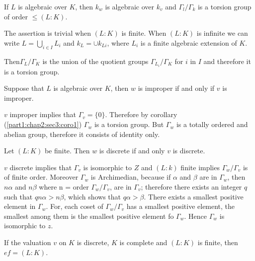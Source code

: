 \begin{corollary}\label{part1:chap2:sec3:coro1}%
  If $L$ is algebraic over $K$, then $k_w$ is algebraic over $k_v$ and
  $\Gamma_l / \Gamma _k$ is a torsion group of order $\leq (L:  K)$. 
\end{corollary}

The assertion is trivial when $(L:  K)$ is finite. When $(L:  K)$ is
infinite we can write $L = \bigcup\limits_{i \in I}L_i$ and $k_L = \cup
k_{Li}$, where $L_i$ is a finite algebraic extension of $K$. 

Then\pageoriginale $\Gamma_L / \Gamma_K$ is the union of the quotient groups
$\Gamma_{L_i} / \Gamma_K$ for $i$ in $I$ and therefore it is a torsion
group. 

\begin{corollary}\label{part1:chap2:sec3:coro2}%
  Suppose that $L$ is algebraic over $K$, then $w$ is improper if and
  only if $v$ is improper. 
\end{corollary}

$v$ improper implies that $\Gamma _v = \{0\}$. Therefore by
corollary (\ref{part1:chap2:sec3:coro1}) $\Gamma_w$ is a torsion group. But $\Gamma_w$ is a
totally ordered and abelian group, therefore it consists of identity
only. 

\begin{corollary}\label{part1:chap2:sec3:coro3}%
  Let $(L:  K)$ be finite. Then $w$ is discrete if and only $v$ is discrete.
\end{corollary}

$v$ discrete implies that $\Gamma_v$ is isomorphic to $Z$ and $(L: 
k)$ finite implies $\Gamma_w/\Gamma_v$ is of finite order. Moreover
$\Gamma_w$ is Archimedian, because if $\alpha$ and $\beta$ are in
$\Gamma_w$, then $n \alpha$ and $n \beta$ where n = order $\Gamma_w /
\Gamma _v$, are in $\Gamma_v$; therefore there exists an integer $q$
such that $qn \alpha > n \beta$, which shows that $q \alpha >
\beta$. There exists a smallest positive element in $\Gamma_w$. For,
each coset of $\Gamma_w / \Gamma _v$ has a smallest positive element,
the smallest among them is the smallest positive element fo
$\Gamma_w$. Hence $\Gamma_w$ is isomorphic to $z$. 

\begin{corollary}\label{part1:chap2:sec3:coro4}%
  If the valuation $v$ on $K$ is discrete, $K$ is complete and $
  (L:  K)$ is finite, then $ef = ( L:  K)$.
\end{corollary}

